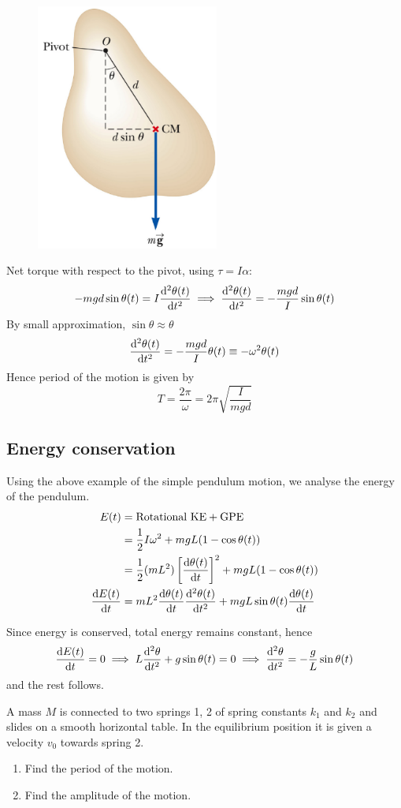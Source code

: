 \begin{figure}[H]
    \centering
    \includegraphics[width=6cm]{images/physical_pendulum.png}
\end{figure}

Net torque with respect to the pivot, using $\tau = I\alpha$:
\[ -mgd\sin\theta(t)=I\dv[2]{\theta(t)}{t} \implies \dv[2]{\theta(t)}{t}=-\frac{mgd}{I}\sin\theta(t) \]
By small approximation, $\sin\theta \approx \theta$
\[ \dv[2]{\theta(t)}{t} = -\frac{mgd}{I}\theta(t) \equiv -\omega^2\theta(t) \]
Hence period of the motion is given by
\[ T=\frac{2\pi}{\omega}=2\pi\sqrt{\frac{I}{mgd}} \]

\subsection{Energy conservation}
Using the above example of the simple pendulum motion, we analyse the energy of the pendulum.
\begin{align*}
E(t) &= \text{Rotational KE} + \text{GPE} \\
&= \frac{1}{2}I\omega^2 + mgL(1-\cos\theta(t)) \\
&= \frac{1}{2}(mL^2)\left[\dv{\theta(t)}{t}\right]^2 + mgL(1-\cos\theta(t)) \\
\dv{E(t)}{t} &= mL^2\dv{\theta(t)}{t}\dv[2]{\theta(t)}{t} + mgL\sin\theta(t)\dv{\theta(t)}{t}
\end{align*}

Since energy is conserved, total energy remains constant, hence
\[ \dv{E(t)}{t}=0 \implies L\dv[2]{\theta}{t} + g\sin\theta(t) = 0 \implies \dv[2]{\theta}{t}=-\frac{g}{L}\sin\theta(t) \]
and the rest follows.
\pagebreak

\begin{exmp}
A mass $M$ is connected to two springs 1, 2 of spring constants $k_1$ and $k_2$ and slides on a smooth horizontal table. In the equilibrium position it is given a velocity $v_0$ towards spring 2.
\begin{enumerate}[label=(\alph*)]
\item Find the period of the motion.
\item Find the amplitude of the motion.
\end{enumerate}
\end{exmp}

